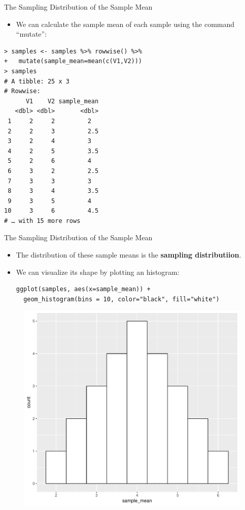 \documentclass[handout]{beamer}
\begin{document}
\begin{frame}[fragile]{The Sampling Distribution of the Sample Mean}
\scriptsize{
\begin{itemize}
\item We can calculate the sample mean of each sample using the command ``mutate'':
\end{itemize}

\begin{verbatim}
> samples <- samples %>% rowwise() %>% 
+   mutate(sample_mean=mean(c(V1,V2)))
> samples
# A tibble: 25 x 3
# Rowwise: 
      V1    V2 sample_mean
   <dbl> <dbl>       <dbl>
 1     2     2         2  
 2     2     3         2.5
 3     2     4         3  
 4     2     5         3.5
 5     2     6         4  
 6     3     2         2.5
 7     3     3         3  
 8     3     4         3.5
 9     3     5         4  
10     3     6         4.5
# … with 15 more rows
\end{verbatim}



} 
\end{frame}



\begin{frame}[fragile]{The Sampling Distribution of the Sample Mean}
\scriptsize{
\begin{itemize}
\item The distribution of these sample means is the \textbf{sampling distributiion}.
\item We can visualize its shape by plotting an histogram: 
\begin{verbatim}
ggplot(samples, aes(x=sample_mean)) + 
  geom_histogram(bins = 10, color="black", fill="white")
\end{verbatim}


\end{itemize}

\begin{figure}[h!]
	\centering
	\includegraphics[scale=0.35]{pics/hist_sampdist.pdf}
\end{figure}


} 
\end{frame}
\end{document}
